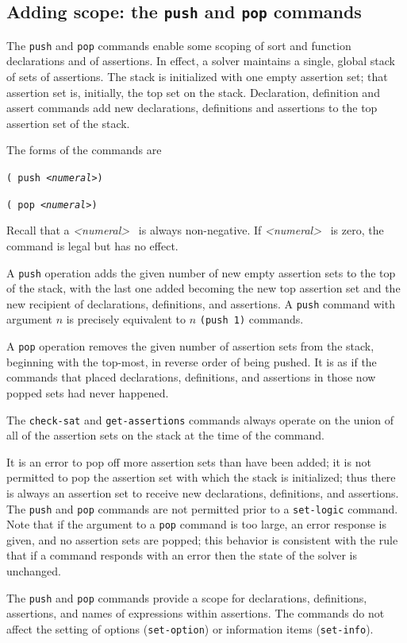 \documentclass[12pt,oneside]{report}
\newcommand{\numeral}{{\it <numeral>}}
\begin{document}
\subsection{Adding scope: the {\tt push} and {\tt pop} commands}

The {\tt push} and {\tt pop} commands enable some scoping of sort and function declarations and of assertions. In effect, a solver
maintains a single, global
stack of sets of assertions.  The stack is initialized with one empty assertion set; that assertion set is, initially, the top set on the stack.
Declaration, definition and assert commands add new declarations, definitions and assertions to the top assertion set of the stack.

The forms of the commands are\\
\centerline{\tt ( push \numeral )}
\centerline{\tt ( pop \numeral )}
Recall that a \numeral~ is always non-negative. If \numeral~ is zero, the command is legal but has no effect.

A {\tt push} operation adds the given number of new empty assertion sets to the top of the stack, with the last one added becoming the new top assertion
set and the new recipient of declarations, definitions, and assertions. A {\tt push} command with argument $n$ is precisely equivalent to 
$n$ {\tt (push 1)} commands.

A {\tt pop} operation removes the given number of assertion sets from 
the stack, beginning with the top-most, in reverse order of being pushed. It is as if the commands that placed declarations, definitions, and assertions in those now popped
sets had never happened.

The {\tt check-sat} and {\tt get-assertions} commands always operate on the union of all of the assertion sets on the stack at the time of
the command.

It is an error to pop off more assertion sets than have been added; it is not permitted to pop the assertion set with which the stack is initialized; thus there is always an assertion set to receive new declarations, definitions, and assertions. The {\tt push} and {\tt pop} 
commands are not permitted prior to a {\tt set-logic} command. Note that if the argument to a 
{\tt pop} command is too large, an error response is given, and no assertion sets are popped; this behavior is consistent with the rule
that if a command responds with an error then the state of the solver is unchanged.

The {\tt push} and {\tt pop} commands provide a scope for declarations, definitions, assertions, and names of expressions within assertions.
The commands do not affect the setting of options ({\tt set-option}) or information items ({\tt set-info}).
\end{document}
